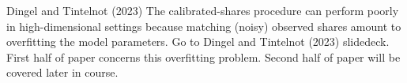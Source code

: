 \documentclass[11pt,notes=hide,aspectratio=169]{beamer}
\begin{document}
\begin{frame}{Dingel and Tintelnot (2023)}
The calibrated-shares procedure can perform poorly in high-dimensional settings because matching (noisy) observed shares amount to overfitting the model parameters.
Go to Dingel and Tintelnot (2023) slidedeck.
First half of paper concerns this overfitting problem.
Second half of paper will be covered later in course.
\end{frame}
\end{document}
